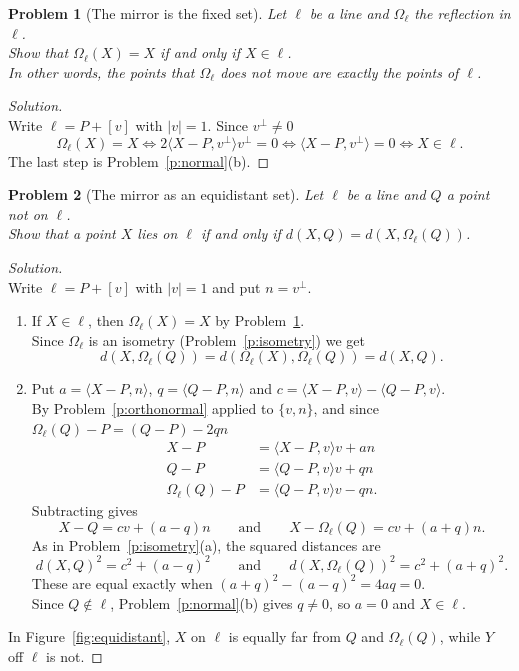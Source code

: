 \documentclass[11pt,a4paper]{article}
\theoremstyle{boxed}
\newtheorem{problem}{Problem}
\theoremstyle{definition}
\newenvironment{solution}{\begin{proof}[Solution]}{\end{proof}}
\newcommand{\ip}[2]{\langle #1, #2 \rangle}
\newcommand{\abs}[1]{\lvert #1 \rvert}
\begin{document}
\begin{problem}[The mirror is the fixed set]\label{p:fixed}
Let $\ell$ be a line and $\Omega_\ell$ the reflection in $\ell$.\\
Show that $\Omega_\ell(X)=X$ if and only if $X\in\ell$.\\
In other words, the points that $\Omega_\ell$ does not move are exactly the points of $\ell$.
\end{problem}

\begin{solution}
\leavevmode\\
Write $\ell=P+[v]$ with $\abs{v}=1$. Since $v^\perp\neq0$
\[
\Omega_\ell(X)=X
\iff 2\ip{X-P}{v^\perp}v^\perp=0
\iff \ip{X-P}{v^\perp}=0
\iff X\in\ell.
\]
The last step is Problem~\ref{p:normal}(b).
\end{solution}

\begin{problem}[The mirror as an equidistant set]\label{p:equidistant}
Let $\ell$ be a line and $Q$ a point not on $\ell$.\\
Show that a point $X$ lies on $\ell$ if and only if $d(X,Q)=d(X,\Omega_\ell(Q))$.
\end{problem}

\begin{solution}
\leavevmode\\
Write $\ell=P+[v]$ with $\abs{v}=1$ and put $n=v^\perp$.
\begin{enumerate}[leftmargin=2.5em]
    \item[($\Rightarrow$)] If $X\in\ell$, then $\Omega_\ell(X)=X$ by Problem~\ref{p:fixed}.\\
    Since $\Omega_\ell$ is an isometry (Problem~\ref{p:isometry}) we get
    \[
    d(X,\Omega_\ell(Q))=d(\Omega_\ell(X),\Omega_\ell(Q))=d(X,Q).
    \]
    \item[($\Leftarrow$)] Put $a=\ip{X-P}{n}$, $q=\ip{Q-P}{n}$ and $c=\ip{X-P}{v}-\ip{Q-P}{v}$.\\
    By Problem~\ref{p:orthonormal} applied to $\{v,n\}$, and since $\Omega_\ell(Q)-P=(Q-P)-2qn$
    \begin{align*}
    X-P &= \ip{X-P}{v}v+an\\
    Q-P &= \ip{Q-P}{v}v+qn\\
    \Omega_\ell(Q)-P &= \ip{Q-P}{v}v-qn.
    \end{align*}
    Subtracting gives
    \[
    X-Q=cv+(a-q)n \qquad\text{and}\qquad X-\Omega_\ell(Q)=cv+(a+q)n.
    \]
    As in Problem~\ref{p:isometry}(a), the squared distances are
    \[
    d(X,Q)^2=c^2+(a-q)^2 \qquad\text{and}\qquad d(X,\Omega_\ell(Q))^2=c^2+(a+q)^2.
    \]
    These are equal exactly when $(a+q)^2-(a-q)^2=4aq=0$.\\
    Since $Q\notin\ell$, Problem~\ref{p:normal}(b) gives $q\neq0$, so $a=0$ and $X\in\ell$.
\end{enumerate}
In Figure~\ref{fig:equidistant}, $X$ on $\ell$ is equally far from $Q$ and $\Omega_\ell(Q)$, while $Y$ off $\ell$ is not.
\end{solution}
\end{document}
